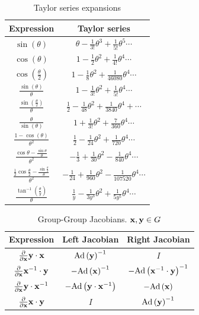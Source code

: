 \begin{table}[ht]
\caption{Taylor series expansions}
\label{tab:taylor_series}
\bgroup
\def\arraystretch{1.5}
\begin{tabular}{cc}
	\toprule
	Expression & Taylor series \\
	\midrule
	$\sin\left(\theta\right)$ & $\theta-\frac{1}{3!}\theta^{3}+\frac{1}{5!}\theta^{5}\cdots$ \\
	$\cos\left(\theta\right)$ & $1-\frac{1}{2}\theta^{2}+\frac{1}{4!}\theta^{4}\cdots$ \\
	$\cos\left(\frac{\theta}{2}\right)$ & $1-\frac{1}{8}\theta^{2}+\frac{1}{46080}\theta^{4}\cdots$ \\
	$\frac{\sin\left(\theta\right)}{\theta}$ & $1-\frac{1}{3!}\theta^{2}+\frac{1}{5!}\theta^{4}\cdots$ \\
	$\frac{\sin\left(\frac{\theta}{2}\right)}{\theta}$ & $\frac{1}{2}-\frac{1}{48}\theta^{2}+\frac{1}{3840}\theta^{4}+\cdots$ \\
	$\frac{\theta}{\sin\left(\theta\right)}$ & $1+\frac{1}{3!}\theta^{2}+\frac{7}{360}\theta^{4}\cdots$ \\
	$\frac{1-\cos\left(\theta\right)}{\theta^{2}}$ & $\frac{1}{2}-\frac{1}{24}\theta^{2}+\frac{1}{720}\theta^{4}\cdots$ \\
	$\frac{\cos\theta-\frac{\sin\theta}{\theta}}{\theta^{2}}$ & $-\frac{1}{3}+\frac{1}{30}\theta^{2}-\frac{1}{840}\theta^{4}\cdots$ \\
	$\frac{\frac{1}{2}\cos\frac{\theta}{2}-\frac{\sin\frac{\theta}{2}}{\theta}}{\theta^{2}}$ & $-\frac{1}{24}+\frac{1}{960}\theta^{2}-\frac{1}{107520}\theta^{4}\cdots$ \\
	$\frac{\tan^{-1}\left(\frac{\theta}{y}\right)}{\theta}$ & $\frac{1}{y}-\frac{1}{3y^{3}}\theta^{2}+\frac{1}{5y^{5}}\theta^{4}\cdots$ \\
	\bottomrule
\end{tabular}
\egroup
\end{table}

\begin{table}[ht]
\caption{Group-Group Jacobians.  \newline $\mathbf{x}, \mathbf{y} \in G$}
\label{tab:lie_identities_group_operations}
\bgroup
\def\arraystretch{2.0}
\begin{tabular}{ccc}
	\toprule
	Expression & Left Jacobian & Right Jacobian\\
	\midrule
	$\frac{\partial}{\partial\mathbf{x}}\mathbf{y}\cdot\mathbf{x}$ & $\textnormal{Ad}\left(\mathbf{y}\right)^{-1}$ & $I$ \\
	$\frac{\partial}{\partial\mathbf{x}}\mathbf{x}^{-1}\cdot\mathbf{y}$ & $-\textnormal{Ad}\left(\mathbf{x}\right)^{-1}$ & $-\textnormal{Ad}\left(\mathbf{x}^{-1}\cdot\mathbf{y}\right)^{-1}$ \\
	$\frac{\partial}{\partial\mathbf{x}}\mathbf{y}\cdot\mathbf{x}^{-1}$ & $-\textnormal{Ad}\left(\mathbf{y}\cdot\mathbf{x}^{-1}\right)$ & $-\textnormal{Ad}\left(\mathbf{x}\right)$ \\
	$\frac{\partial}{\partial\mathbf{x}}\mathbf{x}\cdot\mathbf{y}$ & $I$ & $\textnormal{Ad}\left(\mathbf{y}\right)^{-1}$ \\
	\bottomrule
\end{tabular}
\egroup
\end{table}

